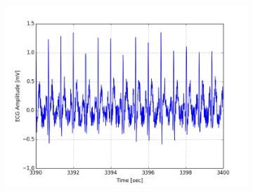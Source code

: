 \documentclass[paper=a4, fontsize=11pt]{scrartcl}
\numberwithin{equation}{section}		%
\numberwithin{figure}{section}			%
\numberwithin{table}{section}		    %
\begin{document}
\begin{appendices}
\begin{figure}[H]
\begin{subfigure}[b]{0.3\textwidth}
		\includegraphics[width=\textwidth]{sim/ecg_75}
	\end{subfigure}
\end{figure}


\end{appendices}
\end{document}
